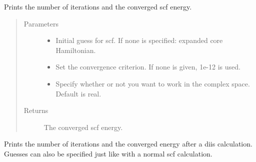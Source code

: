 \documentclass[letterpaper,10pt,english]{sphinxmanual}
\begin{document}
\begin{fulllineitems}

\begin{fulllineitems}
\label{\detokenize{GHF:hf.HartreeFock.GHF.MF.get_scf_solution}}
Prints the number of iterations and the converged scf energy.
\begin{quote}\begin{description}
\item[{Parameters}] \leavevmode\begin{itemize}
\item {} 
 \textendash{} Initial guess for scf. If none is specified: expanded core Hamiltonian.

\item {} 
 \textendash{} Set the convergence criterion. If none is given, 1e-12 is used.

\item {} 
 \textendash{} Specify whether or not you want to work in the complex space. Default is real.

\end{itemize}

\item[{Returns}] \leavevmode
The converged scf energy.

\end{description}\end{quote}

\end{fulllineitems}


\begin{fulllineitems}
\label{\detokenize{GHF:hf.HartreeFock.GHF.MF.get_scf_solution_diis}}
Prints the number of iterations and the converged energy after a diis calculation. Guesses can also be specified
just like with a normal scf calculation.


\end{fulllineitems}
\end{fulllineitems}
\end{document}
